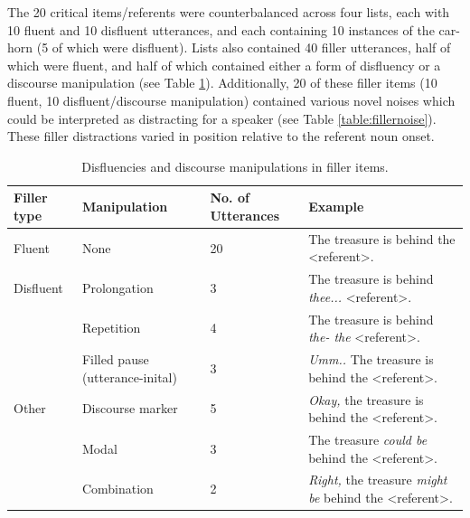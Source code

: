 \documentclass[a4paper,man,natbib]{apa6}
\begin{document}
The 20 critical items/referents were counterbalanced across four lists, each with 10 fluent and 10 disfluent utterances, and each containing 10 instances of the car-horn (5 of which were disfluent). 
Lists also contained 40 filler utterances, half of which were fluent, and half of which contained either a form of disfluency or a discourse manipulation (see Table \ref{table:fillers}). 
Additionally, 20 of these filler items (10 fluent, 10 disfluent/discourse manipulation) contained various novel noises which could be interpreted as distracting for a speaker (see Table \ref{table:fillernoise}). 
These filler distractions varied in position relative to the referent noun onset.

\begin{table}
\begin{tabularx}{\linewidth}{|X|X|X|X|}
  \hline
Filler type & Manipulation & No. of Utterances & Example \\
  \hline
Fluent & None & 20 & The treasure is behind the \textless referent\textgreater . \\
Disfluent & Prolongation & 3 & The treasure is behind \textit{thee...} \textless referent\textgreater . \\
& Repetition & 4 & The treasure is behind \textit{the- the} \textless referent\textgreater .\\
& Filled pause (utterance-inital) & 3 & \textit{Umm..} The treasure is behind the \textless referent\textgreater .\\
Other & Discourse marker & 5 & \textit{Okay,} the treasure is behind the \textless referent\textgreater .\\
& Modal & 3 & The treasure \textit{could be} behind the \textless referent\textgreater .\\ 
& Combination & 2 & \textit{Right,} the treasure \textit{might be} behind the \textless referent\textgreater .\\
   \hline
\end{tabularx}
\caption{Disfluencies and discourse manipulations in filler items.}
\label{table:fillers}
\end{table}
\end{document}
